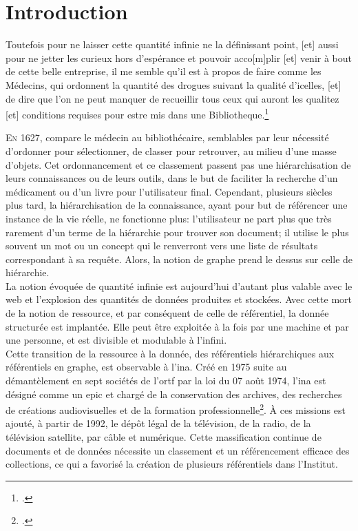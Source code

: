 	\chapter*{\label{introduction_generale}Introduction}

\begin{citationLongue}
	Toutefois pour ne laisser cette quantité infinie ne la définissant point, [et] aussi pour ne jetter les curieux hors d'espérance et pouvoir acco[m]plir [et] venir à bout de cette belle entreprise, il me semble qu'il est à propos de faire comme les Médecins, qui ordonnent la quantité des drogues suivant la qualité d'icelles, [et] de dire que l'on ne peut manquer de recueillir tous ceux qui auront les qualitez [et] conditions requises pour estre mis dans une Bibliotheque.\footcite[p.41-42]{naude_advis_1627}
\end{citationLongue}


\lettrine{E}n 1627,  compare le médecin au bibliothécaire, semblables par leur nécessité d'ordonner pour sélectionner, de classer pour retrouver, au milieu d'une masse d'objets. Cet ordonnancement et ce classement passent pas une hiérarchisation de leurs connaissances ou de leurs outils, dans le but de faciliter la recherche d'un médicament ou d'un livre pour l'utilisateur final. Cependant, plusieurs siècles plus tard, la hiérarchisation de la connaissance, ayant pour but de référencer une instance de la vie réelle, ne fonctionne plus: l'utilisateur ne part plus que très rarement d'un terme de la hiérarchie pour trouver son document; il utilise le plus souvent un mot ou un concept qui le renverront vers une liste de résultats correspondant à sa requête. Alors, la notion de graphe prend le dessus sur celle de hiérarchie.\\

La notion évoquée de \og quantité infinie \fg{} est aujourd'hui d'autant plus valable avec le web et l'explosion des quantités de données produites et stockées. Avec cette mort de la notion de ressource, et par conséquent de celle de référentiel, la donnée structurée est implantée. Elle peut être exploitée à la fois par une machine et par une personne, et est divisible et modulable à l'infini.\\

Cette transition de la ressource à la donnée, des référentiels hiérarchiques aux référentiels en graphe, est observable à l'\ac{ina}. Créé en 1975 suite au démantèlement en sept sociétés de l'\ac{ortf} par la loi du 07 août 1974, l'\ac{ina} est désigné comme un \ac{epic} et \og chargé de la conservation des archives, des recherches de créations audiovisuelles et de la formation professionnelle\fg{}\footcite[art.3]{noauthor_loi_1974}. À ces missions est ajouté, à partir de 1992, le dépôt légal de la télévision, de la radio, de la télévision satellite, par câble et numérique. Cette massification continue de documents et de données nécessite un classement et un référencement efficace des collections, ce qui a favorisé la création de plusieurs référentiels dans l'Institut.\\

